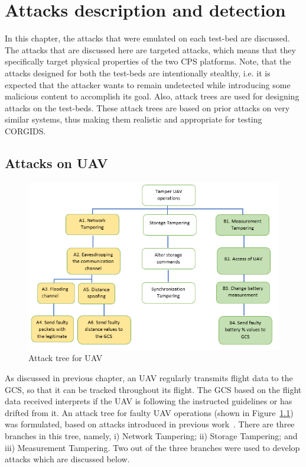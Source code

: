 
\chapter{\textbf{Attacks description and detection}}
\label{ch:Attacks}

In this chapter, the attacks that were emulated on each test-bed are discussed. The attacks that are discussed here are  targeted attacks, which means that they specifically target physical properties of the two \ac{CPS} platforms. Note, that the attacks designed for both the test-beds are intentionally stealthy, i.e. it is expected that the attacker wants to remain undetected while introducing some malicious content to accomplish its goal. Also, attack trees are used for designing attacks on the test-beds. These attack trees are based on prior attacks on very similar systems, thus making them realistic and appropriate for testing \ac{CORGIDS}.


\section{Attacks on \ac{UAV}}

\begin{figure}[ht]
    \centering
    \includegraphics[scale=0.75,keepaspectratio = true]{Graphics/AttackTreeUAVNew.png}
    \caption{Attack tree for UAV}
    \label{fig:attackTreeUAV}
\end{figure}
As discussed in previous chapter, an \ac{UAV} regularly transmits flight data to the \ac{GCS}, so that it can be tracked throughout its flight. The \ac{GCS} based on the flight data received interprets if the \ac{UAV} is following the instructed guidelines or has drifted from it. An attack tree for faulty \ac{UAV} operations (shown in Figure~\ref{fig:attackTreeUAV}) was formulated, based on attacks introduced in previous work~\cite{javaid2012cyber, mitchell2012specification}. There are three branches in this tree, namely, i) Network Tampering; ii) Storage Tampering; and iii) Measurement Tampering. Two out of the three branches were used to develop attacks which are discussed below.

